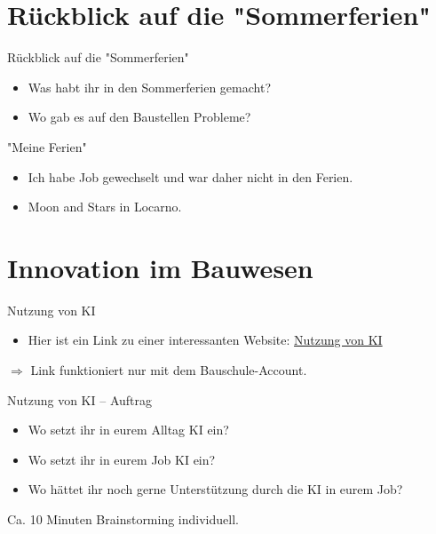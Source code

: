 \section{Rückblick auf die "Sommerferien"}
\BlueSectionSlide

\begin{frame}{Rückblick auf die "Sommerferien"}
    \begin{itemize}
        \item[\textbullet] Was habt ihr in den Sommerferien gemacht?
        \item[\textbullet] Wo gab es auf den Baustellen Probleme?
    \end{itemize}

\end{frame}

\begin{frame}{"Meine Ferien"}
    \begin{itemize}
        \item[\textbullet] Ich habe Job gewechselt und war daher nicht in den Ferien.
        \item[\textbullet] Moon and Stars in Locarno.
    \end{itemize}

\end{frame}


\section{Innovation im Bauwesen}
\BlueSectionSlide

\begin{frame}{Nutzung von KI}

    \begin{itemize}
        \item Hier ist ein Link zu einer interessanten Website: \href{https://schweizerischebau-my.sharepoint.com/:wb:/g/personal/pfaendler_bauschule_ch/EaA6FFoUtUVCvGoMXfZtrMoBPsF2c1g-e0zOir5MbWxZ_Q?e=VzYIgs}{Nutzung von KI}
    \end{itemize}
\vspace{1em}
$\Rightarrow$ Link funktioniert nur mit dem Bauschule-Account.

\end{frame}


\begin{frame}{Nutzung von KI -- Auftrag}
    \begin{itemize}
        \item[\textbullet] Wo setzt ihr in eurem Alltag KI ein?
        \item[\textbullet] Wo setzt ihr in eurem Job KI ein?
        \item[\textbullet] Wo hättet ihr noch gerne Unterstützung durch die KI in eurem Job?
    \end{itemize}
\vspace{1em}
Ca. 10 Minuten Brainstorming individuell.
\end{frame}


